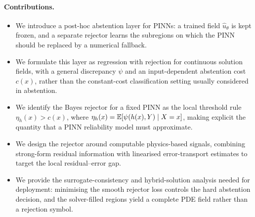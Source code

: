 \paragraph{Contributions.}
\begin{itemize}
\item We introduce a post-hoc abstention layer for PINNs: a trained field
  $\widehat{u}_\theta$ is kept frozen, and a separate rejector learns the
  subregions on which the PINN should be replaced by a numerical fallback.
\item We formulate this layer as regression with rejection for continuous
  solution fields, with a general discrepancy $\psi$ and an
  input-dependent abstention cost $c(x)$, rather than the constant-cost
  classification setting usually considered in abstention.
\item We identify the Bayes rejector for a fixed PINN as the local threshold
  rule $\eta_h(x)>c(x)$, where
  $\eta_h(x)=\mathbb{E}[\psi(h(x),Y)\mid X=x]$, making explicit the quantity that a
  PINN reliability model must approximate.
\item We design the rejector around computable physics-based signals,
  combining strong-form residual information with linearised
  error-transport estimates to target the local residual--error gap.
\item We provide the surrogate-consistency and hybrid-solution analysis
  needed for deployment: minimising the smooth rejector loss controls the
  hard abstention decision, and the solver-filled regions yield a complete
  PDE field rather than a rejection symbol.
\end{itemize}
